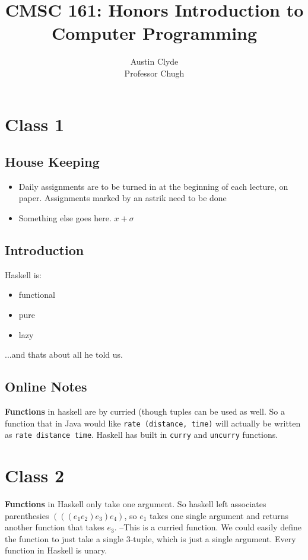 \documentclass[12pt]{article}
\begin{document}
\date{}


\title{CMSC 161: Honors Introduction to Computer Programming}
\author{Austin Clyde\\Professor Chugh}

\maketitle
\section{Class 1}
\subsection{House Keeping}
\begin{itemize}
\item Daily assignments are to be turned in at the beginning of each lecture, on paper. Assignments marked by an astrik need to be done
\item Something else goes here. $x + \sigma$
\end{itemize}

\subsection{Introduction}
Haskell is:
\begin{itemize}
\item functional
\item pure
\item lazy
\end{itemize}
...and thats about all he told us.\\

\subsection{Online Notes}
\textbf{Functions} in haskell are by curried (though tuples can be used as well. So a function that in Java would like {\tt rate (distance, time)} will actually be written as {\tt rate distance time}. Haskell has built in {\tt curry} and {\tt uncurry} functions.


\section{Class 2}
\textbf{Functions} in Haskell only take one argument. So haskell left associates parenthesies {\tt $(((e_1 e_2) e_3) e_4)$}, so $e_1$ takes one single argument and returns another function that takes $e_3$. --This is a curried function. We could easily define the function to just take a single 3-tuple, which is just a single argument. Every function in Haskell is unary.\\
\end{document}
